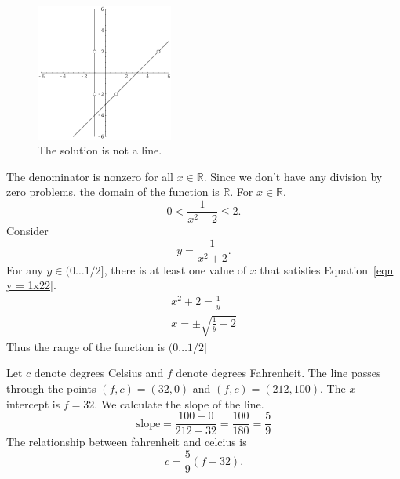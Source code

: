{\begin{Solution}
\begin{enumerate}
\begin{figure}[h!]
\begin{center}
\includegraphics[width=0.4\textwidth]{algebra/sets/not_a_line}
\end{center}
\caption{The solution is not a line.}
\label{fig not a line}
\end{figure}

\end{enumerate}
\end{Solution}








\begin{Solution}
\label{solution domain range 1x22}
The denominator is nonzero for all $x \in \mathbb{R}$.  Since we don't have 
any division by zero problems, the domain of the function is $\mathbb{R}$.
For $x \in \mathbb{R}$, 
\[
0 < \frac{1}{x^2 + 2} \leq 2.
\]
Consider 
\begin{equation}
  \label{eqn y = 1x22}
  y = \frac{1}{x^2 + 2}.
\end{equation}
For any $y \in (0 \ldots 1/2]$, there is at least one value of $x$ that satisfies 
Equation~\ref{eqn y = 1x22}.
\begin{gather*}
  x^2 + 2 = \frac{1}{y}
  \\
  x = \pm \sqrt{ \frac{1}{y} - 2 }
\end{gather*}
Thus the range of the function is $(0 \ldots 1/2]$
\end{Solution}






\begin{Solution}
\label{solution fahrenheit celcius}
Let $c$ denote degrees Celsius and $f$ denote degrees Fahrenheit.  The line
passes through the points $(f,c) = (32,0)$ and $(f,c) = (212,100)$.
The $x$-intercept is $f = 32$.  We calculate the slope of the line.
\[
\mathrm{slope} = \frac{100 - 0}{212 - 32} = \frac{100}{180} = \frac{5}{9}
\]
The relationship between fahrenheit and celcius is
\[
\boxed{
  c = \frac{5}{9} (f - 32).
  }
\]
\end{Solution}





}
